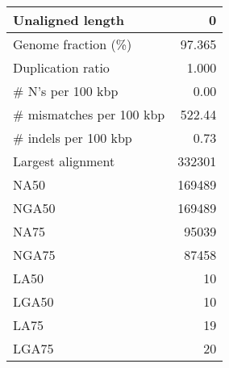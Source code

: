 \documentclass[12pt,a4paper]{article}
\begin{document}
\begin{table}[ht]
\begin{center}
\begin{tabular}{|l*{1}{|r}|}
Unaligned length & 0 \\ \hline
Genome fraction (\%) & 97.365 \\ \hline
Duplication ratio & 1.000 \\ \hline
\# N's per 100 kbp & 0.00 \\ \hline
\# mismatches per 100 kbp & 522.44 \\ \hline
\# indels per 100 kbp & 0.73 \\ \hline
Largest alignment & 332301 \\ \hline
NA50 & 169489 \\ \hline
NGA50 & 169489 \\ \hline
NA75 & 95039 \\ \hline
NGA75 & 87458 \\ \hline
LA50 & 10 \\ \hline
LGA50 & 10 \\ \hline
LA75 & 19 \\ \hline
LGA75 & 20 \\ \hline
\end{tabular}
\end{center}
\end{table}
\end{document}
